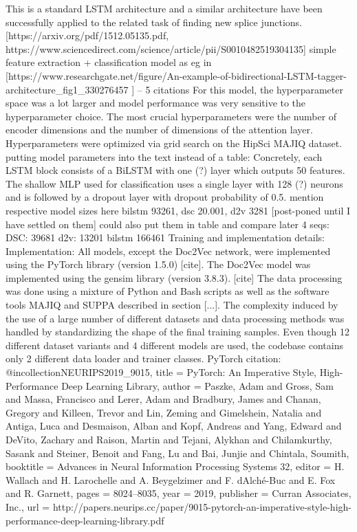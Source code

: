 This is a standard LSTM architecture and a similar architecture have been successfully applied to the related task of finding new splice junctions. [https://arxiv.org/pdf/1512.05135.pdf, https://www.sciencedirect.com/science/article/pii/S0010482519304135]
simple feature extraction + classification model as eg in [https://www.researchgate.net/figure/An-example-of-bidirectional-LSTM-tagger-architecture_fig1_330276457 ] -- 5 citations
For this model, the hyperparameter space was a lot larger and model performance was very sensitive to the hyperparameter choice. The most crucial hyperparameters were the number of encoder dimensions and the number of dimensions of the attention layer. Hyperparameters were optimized via grid search on the HipSci MAJIQ dataset.
putting model parameters into the text instead of a table:
Concretely, each LSTM block consists of a BiLSTM with one (?) layer which outputs 50 features.
The shallow MLP used for classification uses a single layer with 128 (?) neurons and is followed by a dropout layer with dropout probability of 0.5.
mention respective model sizes here
bilstm 93261, dsc 20.001, d2v 3281 [post-poned until I have settled on them]
could also put them in table and compare later
4 seqs:
DSC: 39681
d2v: 13201
bilstm 166461
Training and implementation details:
Implementation:
All models, except the Doc2Vec network, were implemented using the PyTorch library (version 1.5.0) [cite]. The Doc2Vec model was implemented using the gensim library (version 3.8.3). [cite] The data processing was done using a mixture of Python and Bash scripts as well as the software tools MAJIQ and SUPPA described in section [...]. The complexity induced by the use of a large number of different datasets and data processing methods was handled by standardizing the shape of the final training samples. Even though 12 different dataset variants and 4 different models are used, the codebase contains only 2 different data loader and trainer classes.
PyTorch citation:
@incollection{NEURIPS2019_9015,
title = {PyTorch: An Imperative Style, High-Performance Deep Learning Library},
author = {Paszke, Adam and Gross, Sam and Massa, Francisco and Lerer, Adam and Bradbury, James and Chanan, Gregory and Killeen, Trevor and Lin, Zeming and Gimelshein, Natalia and Antiga, Luca and Desmaison, Alban and Kopf, Andreas and Yang, Edward and DeVito, Zachary and Raison, Martin and Tejani, Alykhan and Chilamkurthy, Sasank and Steiner, Benoit and Fang, Lu and Bai, Junjie and Chintala, Soumith},
booktitle = {Advances in Neural Information Processing Systems 32},
editor = {H. Wallach and H. Larochelle and A. Beygelzimer and F. d\textquotesingle Alch\'{e}-Buc and E. Fox and R. Garnett},
pages = {8024--8035},
year = {2019},
publisher = {Curran Associates, Inc.},
url = {http://papers.neurips.cc/paper/9015-pytorch-an-imperative-style-high-performance-deep-learning-library.pdf}
}
